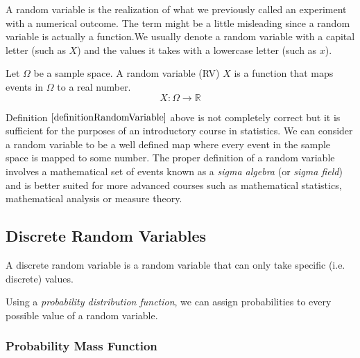A random variable is the realization of what we previously called an experiment with a numerical outcome. The term might be a little misleading since a random variable is actually a function.We usually denote a random variable with a capital letter (such as $X$) and the values it takes with a lowercase letter (such as $x$).

\hfill
\begin{definition}
\label{definitionRandomVariable}
Let $\Omega$ be a sample space. 
A random variable (RV) $X$ is a function that maps events in
$\Omega$ to a real number.
	\begin{equation}
	X : \Omega \longrightarrow \mathbb{R}
	\end{equation}
\end{definition}


\begin{nt}
Definition $\ref{definitionRandomVariable}$ above is not completely correct but it is sufficient for the purposes of an introductory course in statistics.
We can consider a random variable to be a well defined map where every event in
the sample space is mapped to some number. 
The proper definition of a random variable involves a mathematical set of events known as a \textit{sigma algebra}
(or \textit{sigma field}) and is better suited for more advanced courses such as mathematical statistics,
mathematical analysis or measure theory.
\end{nt}

\subsection{Discrete Random Variables}
\label{sectionDiscreteRandomVariable}

\begin{definition}
A discrete random variable is a random variable that can only take specific (i.e. discrete) values.
\end{definition}

\noindent
Using a \textit{probability distribution function}, we can assign probabilities to every possible value of a random variable.

\subsubsection{Probability Mass Function}


